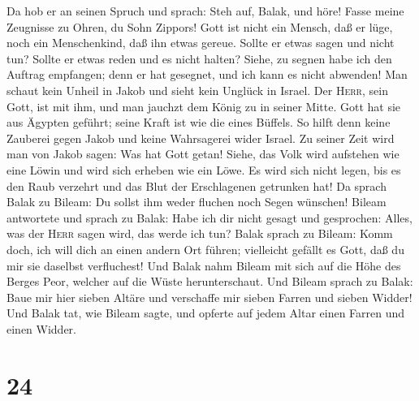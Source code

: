  Da hob er an seinen Spruch und sprach: Steh auf, Balak,
und höre! Fasse meine Zeugnisse zu Ohren, du Sohn Zippors!
 Gott ist nicht ein Mensch, daß er lüge, noch ein
Menschenkind, daß ihn etwas gereue. Sollte er etwas sagen und nicht tun?
Sollte er etwas reden und es nicht halten?  Siehe, zu
segnen habe ich den Auftrag empfangen; denn er hat gesegnet, und ich
kann es nicht abwenden!  Man schaut kein Unheil in Jakob
und sieht kein Unglück in Israel. Der \textsc{Herr}, sein Gott, ist mit
ihm, und man jauchzt dem König zu in seiner Mitte.  Gott
hat sie aus Ägypten geführt; seine Kraft ist wie die eines Büffels.
 So hilft denn keine Zauberei gegen Jakob und keine
Wahrsagerei wider Israel. Zu seiner Zeit wird man von Jakob sagen: Was
hat Gott getan!  Siehe, das Volk wird aufstehen wie eine
Löwin und wird sich erheben wie ein Löwe. Es wird sich nicht legen, bis
es den Raub verzehrt und das Blut der Erschlagenen getrunken hat!
 Da sprach Balak zu Bileam: Du sollst ihm weder fluchen
noch Segen wünschen!  Bileam antwortete und sprach zu
Balak: Habe ich dir nicht gesagt und gesprochen: Alles, was der
\textsc{Herr} sagen wird, das werde ich tun?  Balak
sprach zu Bileam: Komm doch, ich will dich an einen andern Ort führen;
vielleicht gefällt es Gott, daß du mir sie daselbst verfluchest!
 Und Balak nahm Bileam mit sich auf die Höhe des Berges
Peor, welcher auf die Wüste herunterschaut.  Und Bileam
sprach zu Balak: Baue mir hier sieben Altäre und verschaffe mir sieben
Farren und sieben Widder!  Und Balak tat, wie Bileam
sagte, und opferte auf jedem Altar einen Farren und einen Widder.

\hypertarget{section-23}{%
\section{24}\label{section-23}}

